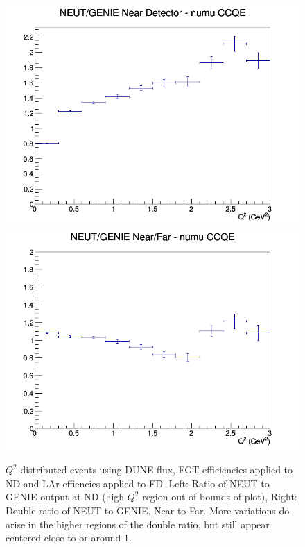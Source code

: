 \documentclass[12pt]{article}
\begin{document}
\begin{figure}[h]
\includegraphics[width=\linewidth]{eff_Q2/FGT/ratios/CCQE_NEUT_GENIE_numu_near_Q2.png}
\endminipage
{}
\includegraphics[width=\linewidth]{eff_Q2/FGT/ratios/CCQE_NEUT_GENIE_numu_NF_Q2.png}
\endminipage
\caption{$Q^2$ distributed events using DUNE flux, FGT efficiencies applied to ND and LAr effiencies applied to FD. Left: Ratio of NEUT to GENIE output at ND (high $Q^2$ region out of bounds of plot), Right: Double ratio of NEUT to GENIE, Near to Far. More variations do arise in the higher regions of the double ratio, but still appear centered close to or around 1.}
\label{fig:Q2_ccqe_FGT_eff}
\end{figure}
\FloatBarrier
\end{document}
